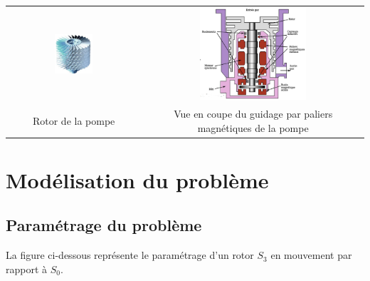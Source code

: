 \documentclass[10pt,fleqn]{article} %
\begin{document}
\begin{center}
\begin{tabular}{cc}
\includegraphics[width=0.3\textwidth]{images/rotor_pompe.jpg}
&
\includegraphics[width=0.5\textwidth]{images/guidage_pompe.jpg}
\\
Rotor de la pompe
&
Vue en coupe du guidage par paliers magnétiques de la pompe
\end{tabular}
\end{center}





\section{Modélisation du problème}
\subsection{Paramétrage du problème}

La figure ci-dessous représente le paramétrage d'un rotor $S_3$ en mouvement par rapport à $S_0$.
\end{document}
